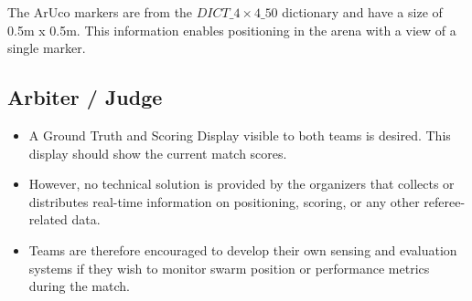 The ArUco markers are from the $DICT\_4\times4\_50$ dictionary and have a size of 0.5m x 0.5m. This information enables positioning in the arena with a view of a single marker.

\subsection{Arbiter / Judge}
\begin{itemize}
	\item{A Ground Truth and Scoring Display visible to both teams is desired. This display should show the current match scores.}
	\item{However, no technical solution is provided by the organizers that collects or distributes real-time information on positioning, scoring, or any other referee-related data.}
	\item{Teams are therefore encouraged to develop their own sensing and evaluation systems if they wish to monitor swarm position or performance metrics during the match.}
\end{itemize}
